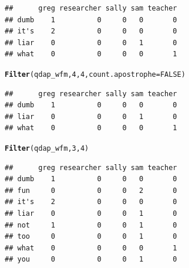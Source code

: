 \documentclass{article}\usepackage[]{graphicx}\usepackage[]{color}
\makeatletter
\newcommand{\hlnum}[1]{\textcolor[rgb]{0.686,0.059,0.569}{#1}}%
\newcommand{\hlstd}[1]{\textcolor[rgb]{0.345,0.345,0.345}{#1}}%
\newcommand{\hlkwc}[1]{\textcolor[rgb]{0.333,0.667,0.333}{#1}}%
\newcommand{\hlkwd}[1]{\textcolor[rgb]{0.737,0.353,0.396}{\textbf{#1}}}%
\newenvironment{kframe}{%
 \def\at@end@of@kframe{}%
 \ifinner\ifhmode%
  \def\at@end@of@kframe{\end{minipage}}%
  \begin{minipage}{\columnwidth}%
 \fi\fi%
 \def\FrameCommand##1{\hskip\@totalleftmargin \hskip-\fboxsep
 \colorbox{shadecolor}{##1}\hskip-\fboxsep
     \hskip-\linewidth \hskip-\@totalleftmargin \hskip\columnwidth}%
 \MakeFramed {\advance\hsize-\width
   \@totalleftmargin\z@ \linewidth\hsize
   \@setminipage}}%
 {\par\unskip\endMakeFramed%
 \at@end@of@kframe}
\newenvironment{knitrout}{}{} %
\makeatother
\begin{document}
\begin{knitrout}
\color{fgcolor}\begin{kframe}
\begin{verbatim}
##      greg researcher sally sam teacher
## dumb    1          0     0   0       0
## it's    2          0     0   0       0
## liar    0          0     0   1       0
## what    0          0     0   0       1
\end{verbatim}
\end{kframe}
\end{knitrout}


\begin{knitrout}
\color{fgcolor}\begin{kframe}
\begin{alltt}
\hlkwd{Filter}\hlstd{(qdap_wfm,} \hlnum{4}\hlstd{,} \hlnum{4}\hlstd{,} \hlkwc{count.apostrophe} \hlstd{=} \hlnum{FALSE}\hlstd{)}
\end{alltt}
\end{kframe}
\end{knitrout}


\begin{knitrout}
\color{fgcolor}\begin{kframe}
\begin{verbatim}
##      greg researcher sally sam teacher
## dumb    1          0     0   0       0
## liar    0          0     0   1       0
## what    0          0     0   0       1
\end{verbatim}
\end{kframe}
\end{knitrout}


\begin{knitrout}
\color{fgcolor}\begin{kframe}
\begin{alltt}
\hlkwd{Filter}\hlstd{(qdap_wfm,} \hlnum{3}\hlstd{,} \hlnum{4}\hlstd{)}
\end{alltt}
\end{kframe}
\end{knitrout}


\begin{knitrout}
\color{fgcolor}\begin{kframe}
\begin{verbatim}
##      greg researcher sally sam teacher
## dumb    1          0     0   0       0
## fun     0          0     0   2       0
## it's    2          0     0   0       0
## liar    0          0     0   1       0
## not     1          0     0   1       0
## too     0          0     0   1       0
## what    0          0     0   0       1
## you     0          0     0   1       0
\end{verbatim}
\end{kframe}
\end{knitrout}
\end{document}
